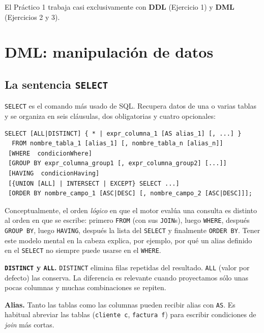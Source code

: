\documentclass[11pt,a4paper]{article}
\begin{document}
El Práctico 1 trabaja casi exclusivamente con \textbf{DDL} (Ejercicio 1)
y \textbf{DML} (Ejercicios 2 y 3).

\section{DML: manipulación de datos}

\subsection{La sentencia \texttt{SELECT}}

\texttt{SELECT} es el comando más usado de SQL. Recupera datos de una o varias
tablas y se organiza en seis cláusulas, dos obligatorias y cuatro opcionales:

\begin{lstlisting}
SELECT [ALL|DISTINCT] { * | expr_columna_1 [AS alias_1] [, ...] }
  FROM nombre_tabla_1 [alias_1] [, nombre_tabla_n [alias_n]]
 [WHERE  condicionWhere]
 [GROUP BY expr_columna_group1 [, expr_columna_group2] [...]]
 [HAVING  condicionHaving]
 [{UNION [ALL] | INTERSECT | EXCEPT} SELECT ...]
 [ORDER BY nombre_campo_1 [ASC|DESC] [, nombre_campo_2 [ASC|DESC]]];
\end{lstlisting}

Conceptualmente, el orden \emph{lógico} en que el motor evalúa una consulta es
distinto al orden en que se escribe: primero \texttt{FROM} (con sus
\texttt{JOIN}s), luego \texttt{WHERE}, después \texttt{GROUP BY}, luego
\texttt{HAVING}, después la lista del \texttt{SELECT} y finalmente
\texttt{ORDER BY}. Tener este modelo mental en la cabeza explica, por ejemplo,
por qué un alias definido en el \texttt{SELECT} no siempre puede usarse
en el \texttt{WHERE}.

\textbf{\texttt{DISTINCT} y \texttt{ALL}.} \texttt{DISTINCT} elimina filas
repetidas del resultado. \texttt{ALL} (valor por defecto) las conserva. La
diferencia es relevante cuando proyectamos sólo unas pocas columnas y muchas
combinaciones se repiten.

\textbf{Alias.} Tanto las tablas como las columnas pueden recibir alias con
\texttt{AS}. Es habitual abreviar las tablas (\texttt{cliente c},
\texttt{factura f}) para escribir condiciones de \emph{join} más cortas.
\end{document}
